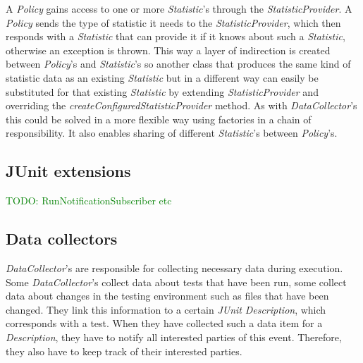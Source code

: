 \documentclass[i2]{oss}
\newcommand{\class}[1]{\emph{#1}}
\newcommand{\method}[1]{\emph{#1}}
\newcommand{\junit}{\emph{JUnit }}
\newcommand{\comment}[1]{{\huge \textcolor{green}{#1}}\\}
\begin{document}
A \class{Policy} gains access to one or more \class{Statistic}'s through
the \class{StatisticProvider}.
A \class{Policy} sends the type of statistic it needs to the 
\class{StatisticProvider}, which then responds with a \class{Statistic}
that can provide it if it knows about such a \class{Statistic}, otherwise
an exception is thrown.
This way a layer of indirection is created between \class{Policy}'s and
\class{Statistic}'s so another class that produces the same kind of 
statistic data as an existing \class{Statistic} but in a different way 
can easily be substituted for that existing \class{Statistic} by 
extending \class{StatisticProvider} and overriding the 
\method{createConfiguredStatisticProvider} method.
As with \class{DataCollector}'s this could be solved in a more flexible
way using factories in a chain of responsibility.
It also enables sharing of different \class{Statistic}'s between 
\class{Policy}'s. \\


\subsection{JUnit extensions}
\label{subssec:JUnit extensions}

\comment{TODO: RunNotificationSubscriber etc}



\subsection{Data collectors}
\label{subssec:Data collectors}

\class{DataCollector}'s are responsible for collecting necessary data 
during execution.
Some \class{DataCollector}'s collect data about tests that have been 
run, some collect data about changes in the testing environment such as 
files that have been changed.
They link this information to a certain \junit \class{Description}, which corresponds with a test.
When they have collected such a data item for a \class{Description}, they have to notify all interested parties of this event.
Therefore, they also have to keep track of their interested parties.
\end{document}
